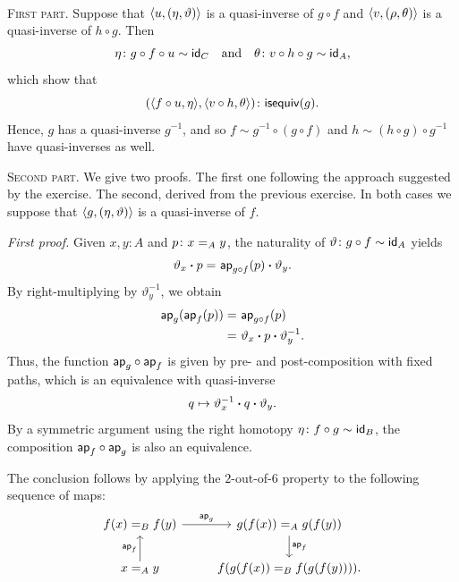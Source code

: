 \begin{solution}\ 

    \textsc{First part.}
    Suppose that $\langle u,(\eta,\vartheta)\rangle$ is a quasi-inverse of $g\circ f$ and $\langle v,(\rho,\theta)\rangle$ is a quasi-inverse of $h\circ g$. Then
    \begin{align*}
        \eta\colon g\circ f\circ u\sim\id_C
        \quad\text{and}\quad
        \theta\colon v\circ h\circ g\sim\id_A,
    \end{align*}
    which show that
    \[
        (\dep{f\circ u,\eta},\dep{v\circ h,\theta})
        \colon\fun{isequiv}(g).
    \]
    Hence, $g$ has a quasi-inverse $g^{-1}$, and so $f\sim g^{-1}\circ(g\circ f)$ and $h\sim(h\circ g)\circ g^{-1}$ have quasi-inverses as well.

    \medskip

    \textsc{Second part.} We give two proofs. The first one following the approach suggested by the exercise. The second, derived from the previous exercise. In both cases we suppose that\/ $\langle g,(\eta,\vartheta)\rangle$ is a quasi-inverse of\/ $f$.

    \textit{First proof.}
    Given $x,y\colon A$ and $p\colon x\eq{A}y$, the naturality of $\vartheta\colon g\circ f\sim\id_A$ yields
    \[
        \vartheta_x\mathbin{\boldsymbol{\cdot}} p\mathrel{=_{}}\mathsf{ap}_{g\circ f}(p)\mathbin{\boldsymbol{\cdot}}\vartheta_y.
    \]
    By right-multiplying by $\vartheta_y^{-1}$, we obtain
    \begin{align*}
        \mathsf{ap}_g(\mathsf{ap}_f(p))
            &\mathrel{=_{}}\mathsf{ap}_{g\circ f}(p)\\
            &\mathrel{=_{}}\vartheta_x\mathbin{\boldsymbol{\cdot}} p\mathbin{\boldsymbol{\cdot}}\vartheta_y^{-1}.
    \end{align*}
    Thus, the function $\mathsf{ap}_g\circ\mathsf{ap}_f$ is given by pre- and post-composition with fixed paths, which is an equivalence with quasi-inverse
    \[
        q\mapsto\vartheta_x^{-1}\mathbin{\boldsymbol{\cdot}} q\mathbin{\boldsymbol{\cdot}}\vartheta_y.
    \]
    By a symmetric argument using the right homotopy $\eta\colon f\circ g\sim\id_B$, the composition $\mathsf{ap}_f\circ\mathsf{ap}_g$ is also an equivalence.

    The conclusion follows by applying the $2$-out-of-$6$ property to the following sequence of maps:
    \[
    \begin{tikzcd}
        f(x)\eq{B}f(y)
                \arrow[r,"\fun{ap}_g"]
            &g(f(x))\eq{A}g(f(y))
                \arrow[d,"\fun{ap}_f"]\\
        x\eq{A}y
                \arrow[u,"\fun{ap}_f"]
            &f(g(f(x))\eq{B}f(g(f(y)))).
    \end{tikzcd}
    \]


\end{solution}
